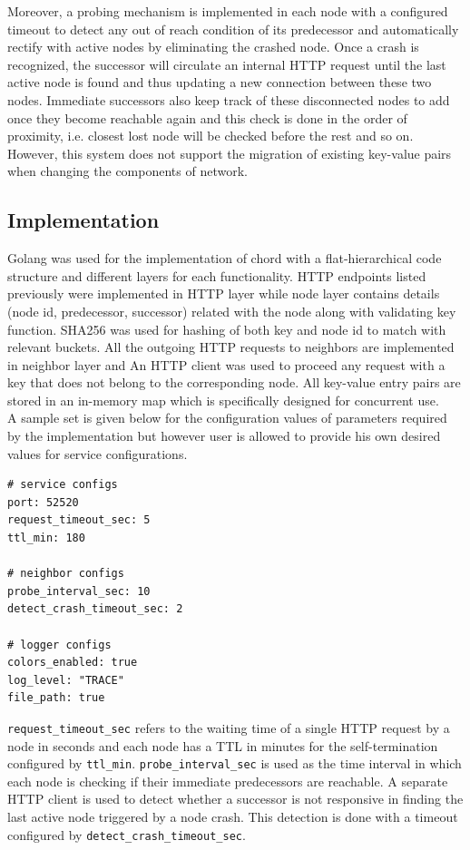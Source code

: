 \documentclass[
    a4paper,
    twocolumn,
]{article}
\begin{document}
Moreover, a probing mechanism is implemented in each node with a configured timeout to detect any out of reach condition of its predecessor and automatically rectify with active nodes by eliminating the crashed node. Once a crash is recognized, the successor will circulate an internal HTTP request until the last active node is found and thus updating a new connection between these two nodes. Immediate successors also keep track of these disconnected nodes to add once they become reachable again and this check is done in the order of proximity, i.e. closest lost node will be checked before the rest and so on. However, this system does not support the migration of existing key-value pairs when changing the components of network.

\subsection{Implementation}

Golang was used for the implementation of chord with a flat-hierarchical code structure and different layers for each functionality. HTTP endpoints listed previously were implemented in HTTP layer while node layer contains details (node id, predecessor, successor) related with the node along with validating key function. SHA256 was used for hashing of both key and node id to match with relevant buckets. All the outgoing HTTP requests to neighbors are implemented in neighbor layer and An HTTP client was used to proceed any request with a key that does not belong to the corresponding node. All key-value entry pairs are stored in an in-memory map which is specifically designed for concurrent use.\\

A sample set is given below for the configuration values of parameters required by the implementation but however user is allowed to provide his own desired values for service configurations. 

\begin{verbatim}
# service configs
port: 52520
request_timeout_sec: 5
ttl_min: 180

# neighbor configs
probe_interval_sec: 10
detect_crash_timeout_sec: 2

# logger configs
colors_enabled: true
log_level: "TRACE"
file_path: true
\end{verbatim}

\texttt{request\_timeout\_sec} refers to the waiting time of a single HTTP request by a node in seconds and each node has a TTL in minutes for the self-termination configured by \texttt{ttl\_min}. \texttt{probe\_interval\_sec} is used as the time interval in which each node is checking if their immediate predecessors are reachable. A separate HTTP client is used to detect whether a successor is not responsive in finding the last active node triggered by a node crash. This detection is done with a timeout configured by \texttt{detect\_crash\_timeout\_sec}.
\end{document}

